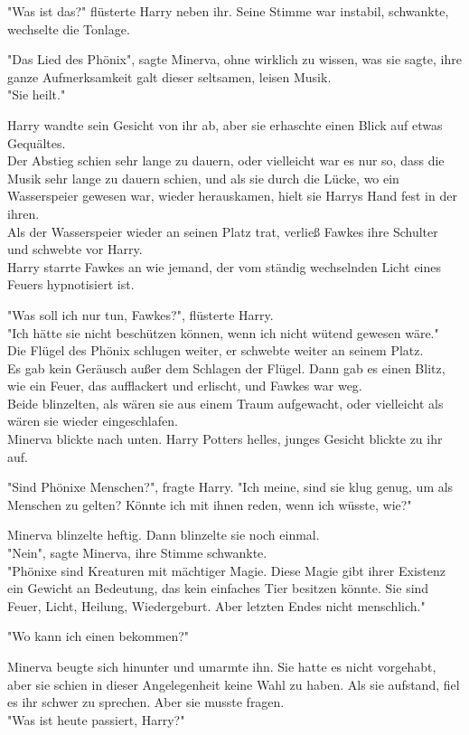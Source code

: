 {"Was ist das?" flüsterte Harry neben ihr. Seine Stimme war instabil, schwankte, wechselte die Tonlage.

"Das Lied des Phönix", sagte Minerva, ohne wirklich zu wissen, was sie sagte, ihre ganze Aufmerksamkeit galt dieser seltsamen, leisen Musik.\\ "Sie heilt."

Harry wandte sein Gesicht von ihr ab, aber sie erhaschte einen Blick auf etwas Gequältes.\\ Der Abstieg schien sehr lange zu dauern, oder vielleicht war es nur so, dass die Musik sehr lange zu dauern schien, und als sie durch die Lücke, wo ein Wasserspeier gewesen war, wieder herauskamen, hielt sie Harrys Hand fest in der ihren.\\ Als der Wasserspeier wieder an seinen Platz trat, verließ Fawkes ihre Schulter und schwebte vor Harry.\\ Harry starrte Fawkes an wie jemand, der vom ständig wechselnden Licht eines Feuers hypnotisiert ist.

"Was soll ich nur tun, Fawkes?", flüsterte Harry.\\ "Ich hätte sie nicht beschützen können, wenn ich nicht wütend gewesen wäre."\\ Die Flügel des Phönix schlugen weiter, er schwebte weiter an seinem Platz.\\ Es gab kein Geräusch außer dem Schlagen der Flügel. Dann gab es einen Blitz, wie ein Feuer, das aufflackert und erlischt, und Fawkes war weg.\\ Beide blinzelten, als wären sie aus einem Traum aufgewacht, oder vielleicht als wären sie wieder eingeschlafen.\\ Minerva blickte nach unten. Harry Potters helles, junges Gesicht blickte zu ihr auf.

"Sind Phönixe Menschen?", fragte Harry. "Ich meine, sind sie klug genug, um als Menschen zu gelten? Könnte ich mit ihnen reden, wenn ich wüsste, wie?"

Minerva blinzelte heftig. Dann blinzelte sie noch einmal.\\ "Nein", sagte Minerva, ihre Stimme schwankte.\\ "Phönixe sind Kreaturen mit mächtiger Magie. Diese Magie gibt ihrer Existenz ein Gewicht an Bedeutung, das kein einfaches Tier besitzen könnte. Sie sind Feuer, Licht, Heilung, Wiedergeburt. Aber letzten Endes nicht menschlich."

"Wo kann ich einen bekommen?"

Minerva beugte sich hinunter und umarmte ihn. Sie hatte es nicht vorgehabt, aber sie schien in dieser Angelegenheit keine Wahl zu haben. Als sie aufstand, fiel es ihr schwer zu sprechen. Aber sie musste fragen.\\ "Was ist heute passiert, Harry?"

}
